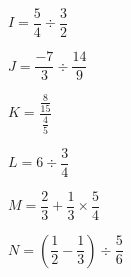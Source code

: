 \documentclass[a4paper]{book}
\begin{document}
    
    \begin{exercice}[Divisions]
        \begin{minipage}{0.24\linewidth}
            $I = \dfrac{5}{4} \div \dfrac{3}{2}$
            \vspace{4cm}
        \end{minipage}
        \hfill\vline\hfill
        \begin{minipage}{0.24\linewidth}
            $J = \dfrac{-7}{3} \div \dfrac{14}{9}$
            \vspace{4cm}
        \end{minipage}        
        \hfill\vline\hfill
        \begin{minipage}{0.24\linewidth}
            $K = \dfrac{\frac{8}{15}}{\frac{4}{5}}$
            \vspace{4cm}
        \end{minipage}
        \hfill\vline\hfill
        \begin{minipage}{0.24\linewidth}
            $L = 6 \div \dfrac{3}{4}$
            \vspace{4cm}
        \end{minipage}
    \end{exercice}
    
    
    \begin{exercice}
        \begin{minipage}{0.48\linewidth}
            $M = \dfrac{2}{3} + \dfrac{1}{3} \times \dfrac{5}{4}$
            \vspace{4cm}
        \end{minipage}
        \hfill\vline\hfill
        \begin{minipage}{0.48\linewidth}
            $N = \left( \dfrac{1}{2} - \dfrac{1}{3} \right) \div \dfrac{5}{6}$
            \vspace{4cm}
        \end{minipage}
    \end{exercice}
\end{document}

